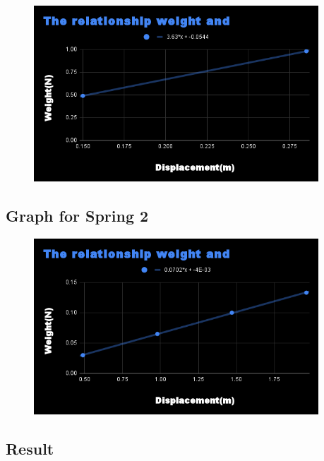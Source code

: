 \documentclass{report}
\begin{document}
\begin{figure}[h!]
  \begin{center}
    \includegraphics[width=0.95\textwidth]{figures/graph2.png}
  \end{center}
\end{figure}

\newpage

\subsection*{Graph for Spring 2}

\begin{figure}[h!]
  \begin{center}
    \includegraphics[width=0.95\textwidth]{figures/graph3.png}
  \end{center}
\end{figure}

\subsection*{Result}
\end{document}
